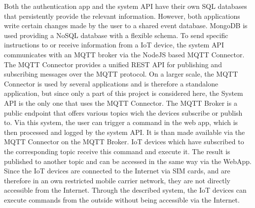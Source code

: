         Both the authentication app and the system \ac{API} have their own SQL databases that persistently provide the relevant information. However, both applications write certain changes made by the user to a shared event database. MongoDB is used providing a NoSQL database with a flexible schema. To send specific instructions to or receive information from a \ac{IoT} device, the system \ac{API} communicates with an MQTT broker via the NodeJS based MQTT Connector. The MQTT Connector provides a unified \ac{REST} \ac{API} for publishing and subscribing messages over the MQTT protocol. On a larger scale, the MQTT Connector is used by several applications and is therefore a standalone application, but since only a part of this project is considered here, the System API is the only one that uses the MQTT Connector. The MQTT Broker is a public endpoint that offers various topics wich the devices subscribe or publish to. Via this system, the user can trigger a command in the web app, which is then processed and logged by the system \ac{API}. It is than made available via the MQTT Connector on the MQTT Broker. IoT devices which have subscribed to the corresponding topic receive this command and execute it. The result is published to another topic and can be accessed in the same way via the WebApp. Since the IoT devices are connected to the Internet via SIM cards, and are therefore in an own restricted mobile carrier network, they are not directly accessible from the Internet. Through the described system, the IoT devices can execute commands from the outside without being accessible via the Internet.

